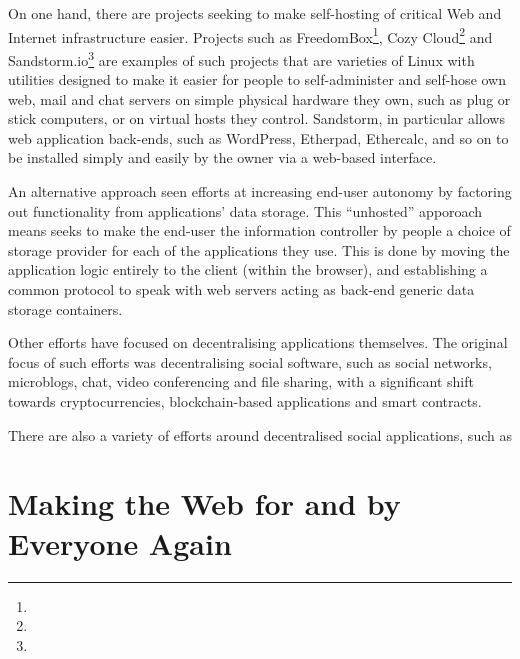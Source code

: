 \documentclass{amsart}
\begin{document}
On one hand, there are projects seeking to make self-hosting of critical Web and Internet infrastructure easier. Projects such as FreedomBox\footnote{}, Cozy Cloud\footnote{} and Sandstorm.io\footnote{} are examples of such projects that are varieties of Linux with utilities designed to make it easier for people to self-administer and self-hose own web, mail and chat servers on simple physical hardware they own, such as plug or stick computers, or on virtual hosts they control.  Sandstorm, in particular allows web application back-ends, such as WordPress, Etherpad, Ethercalc, and so on to be installed simply and easily by the owner via a web-based interface.  

An alternative approach seen efforts at increasing end-user autonomy by factoring out functionality from applications' data storage.  This ``unhosted'' apporoach means seeks to make the end-user the information controller by people a choice of storage provider for each of the applications they use.  This is done by moving the application logic entirely to the client (within the browser), and establishing a common protocol to speak with web servers acting as back-end generic data storage containers.

Other efforts have focused on decentralising applications themselves.  The original focus of such efforts was  decentralising social software, such as social networks, microblogs, chat, video conferencing and file sharing, with a significant shift towards cryptocurrencies, blockchain-based applications and smart contracts. 

There are also a variety of efforts around decentralised social applications, such as 

\section{Making the Web for and by Everyone Again}


\end{document}
